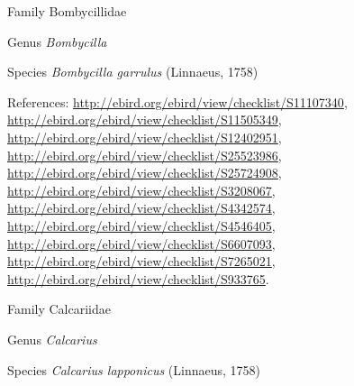 \documentclass[9pt, article]{memoir}
\begin{document}
\begin{multicols}{2}
\vspace{6pt}\noindent\hspace{24pt}Family Bombycillidae


\vspace{6pt}\noindent\hspace{30pt}Genus \textit{Bombycilla}


\vspace{6pt}\noindent\hspace{36pt}Species \textit{Bombycilla garrulus} (Linnaeus, 1758)


\vspace{6pt}References: 
\url{http://ebird.org/ebird/view/checklist/S11107340}, 
\url{http://ebird.org/ebird/view/checklist/S11505349}, 
\url{http://ebird.org/ebird/view/checklist/S12402951}, 
\url{http://ebird.org/ebird/view/checklist/S25523986}, 
\url{http://ebird.org/ebird/view/checklist/S25724908}, 
\url{http://ebird.org/ebird/view/checklist/S3208067}, 
\url{http://ebird.org/ebird/view/checklist/S4342574}, 
\url{http://ebird.org/ebird/view/checklist/S4546405}, 
\url{http://ebird.org/ebird/view/checklist/S6607093}, 
\url{http://ebird.org/ebird/view/checklist/S7265021}, 
\url{http://ebird.org/ebird/view/checklist/S933765}.

\vspace{6pt}\noindent\hspace{24pt}Family Calcariidae


\vspace{6pt}\noindent\hspace{30pt}Genus \textit{Calcarius}


\vspace{6pt}\noindent\hspace{36pt}Species \textit{Calcarius lapponicus} (Linnaeus, 1758)



\end{multicols}
\end{document}
